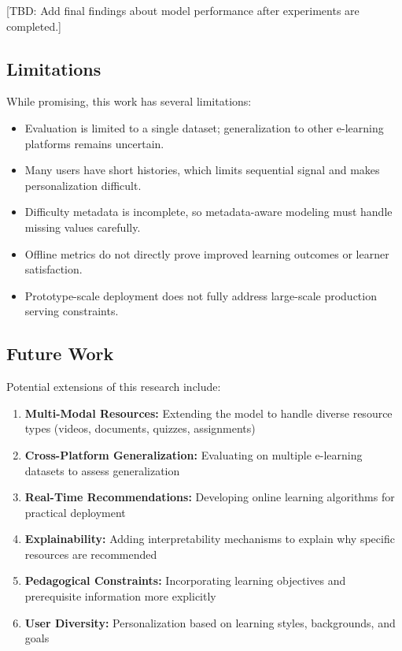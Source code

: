 [TBD: Add final findings about model performance after experiments are completed.]

\subsection{Limitations}

While promising, this work has several limitations:

\begin{itemize}
    \item Evaluation is limited to a single dataset; generalization to other e-learning platforms remains uncertain.
    \item Many users have short histories, which limits sequential signal and makes personalization difficult.
    \item Difficulty metadata is incomplete, so metadata-aware modeling must handle missing values carefully.
    \item Offline metrics do not directly prove improved learning outcomes or learner satisfaction.
    \item Prototype-scale deployment does not fully address large-scale production serving constraints.
\end{itemize}

\subsection{Future Work}

Potential extensions of this research include:

\begin{enumerate}
    \item \textbf{Multi-Modal Resources:} Extending the model to handle diverse resource types (videos, documents, quizzes, assignments)
    \item \textbf{Cross-Platform Generalization:} Evaluating on multiple e-learning datasets to assess generalization
    \item \textbf{Real-Time Recommendations:} Developing online learning algorithms for practical deployment
    \item \textbf{Explainability:} Adding interpretability mechanisms to explain why specific resources are recommended
    \item \textbf{Pedagogical Constraints:} Incorporating learning objectives and prerequisite information more explicitly
    \item \textbf{User Diversity:} Personalization based on learning styles, backgrounds, and goals
\end{enumerate}

